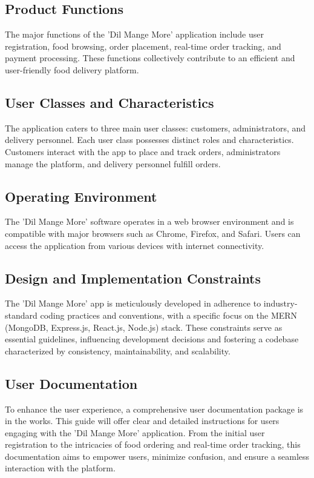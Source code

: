 \documentclass{article}
\begin{document}
\subsection{Product Functions}
The major functions of the 'Dil Mange More' application include user registration, food browsing, order placement, real-time order tracking, and payment processing. These functions collectively contribute to an efficient and user-friendly food delivery platform.

\subsection{User Classes and Characteristics}
The application caters to three main user classes: customers, administrators, and delivery personnel. Each user class possesses distinct roles and characteristics. Customers interact with the app to place and track orders, administrators manage the platform, and delivery personnel fulfill orders.

\subsection{Operating Environment}
The 'Dil Mange More' software operates in a web browser environment and is compatible with major browsers such as Chrome, Firefox, and Safari. Users can access the application from various devices with internet connectivity.

\subsection{Design and Implementation Constraints}
The 'Dil Mange More' app is meticulously developed in adherence to industry-standard coding practices and conventions, with a specific focus on the MERN (MongoDB, Express.js, React.js, Node.js) stack. These constraints serve as essential guidelines, influencing development decisions and fostering a codebase characterized by consistency, maintainability, and scalability.

\subsection{User Documentation}
To enhance the user experience, a comprehensive user documentation package is in the works. This guide will offer clear and detailed instructions for users engaging with the 'Dil Mange More' application. From the initial user registration to the intricacies of food ordering and real-time order tracking, this documentation aims to empower users, minimize confusion, and ensure a seamless interaction with the platform.
\end{document}
